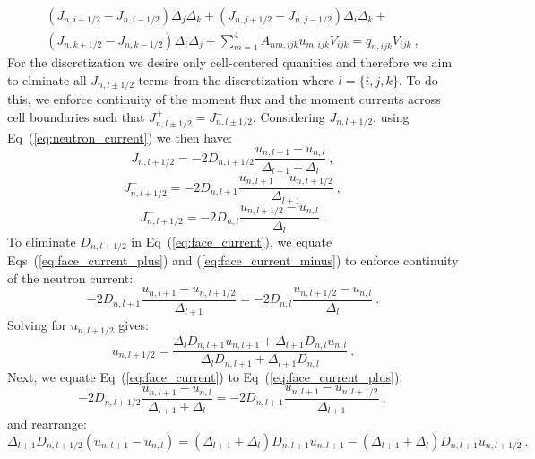 \begin{multline}
(J_{n,i+1/2} - J_{n,i-1/2}) \Delta_j \Delta_k + (J_{n,j+1/2} -
  J_{n,j-1/2}) \Delta_i \Delta_k +\\ (J_{n,k+1/2} - J_{n,k-1/2})
  \Delta_i \Delta_j + \sum_{m=1}^4 A_{nm,ijk} u_{m,ijk} V_{ijk} =
  q_{n,ijk} V_{ijk}\:,
  \label{eq:discrete_current}
\end{multline}
For the discretization we desire only cell-centered quanities and
therefore we aim to elminate all $J_{n,l \pm 1/2}$ terms from the
discretization where $l = \{i,j,k\}$. To do this, we enforce
continuity of the moment flux and the moment currents across cell
boundaries such that $J_{n,l \pm 1/2}^+ = J_{n,l \pm
  1/2}^-$. Considering $J_{n,l+1/2}$, using
Eq~(\ref{eq:neutron_current}) we then have:
\begin{equation}
  J_{n,l+1/2} = -2 D_{n,l+1/2}\frac{u_{n,l+1} - u_{n,l}}{\Delta_{l+1}+
    \Delta_{l}}\:,
  \label{eq:face_current}
\end{equation}
\begin{equation}
  J_{n,l+1/2}^+ = -2 D_{n,l+1}\frac{u_{n,l+1} - u_{n,l+1/2}}{\Delta_{l+1}}\:,
  \label{eq:face_current_plus}
\end{equation}
\begin{equation}
  J_{n,l+1/2}^- = -2 D_{n,l}\frac{u_{n,l+1/2} - u_{n,l}}{\Delta_{l}}\:.
  \label{eq:face_current_minus}
\end{equation}
To eliminate $D_{n,l+1/2}$ in Eq~(\ref{eq:face_current}), we equate
Eqs~(\ref{eq:face_current_plus}) and (\ref{eq:face_current_minus}) to
enforce continuity of the neutron current:
\begin{equation}
  -2 D_{n,l+1}\frac{u_{n,l+1} - u_{n,l+1/2}}{\Delta_{l+1}} = -2
  D_{n,l}\frac{u_{n,l+1/2} - u_{n,l}}{\Delta_{l}}\:.
  \label{eq:face_current_equality}
\end{equation}
Solving for $u_{n,l+1/2}$ gives:
\begin{equation}
  u_{n,l+1/2} = \frac{\Delta_l D_{n,l+1} u_{n,l+1} + \Delta_{l+1}
    D_{n,l} u_{n,l}}{\Delta_l D_{n,l+1} + \Delta_{l+1} D_{n,l}}\:.
  \label{eq:face_flux}
\end{equation}
Next, we equate Eq~(\ref{eq:face_current}) to
Eq~(\ref{eq:face_current_plus}):
\begin{equation}
-2 D_{n,l+1/2}\frac{u_{n,l+1} - u_{n,l}}{\Delta_{l+1} + \Delta_{l}} =
-2 D_{n,l+1}\frac{u_{n,l+1} - u_{n,l+1/2}}{\Delta_{l+1}}\:,
  \label{eq:face_current_solve}
\end{equation}
and rearrange:
\begin{equation}
  \Delta_{l+1} D_{n,l+1/2} (u_{n,l+1} - u_{n,l}) = (\Delta_{l+1} +
  \Delta_l) D_{n,l+1}u_{n,l+1} - (\Delta_{l+1} + \Delta_l)
  D_{n,l+1}u_{n,l+1/2}\:.
  \label{eq:face_current_solve_2}
\end{equation}
